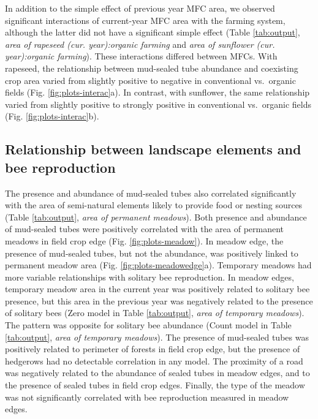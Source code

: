 \documentclass[smallextended]{svjour3}       %
\begin{document}
In addition to the simple effect of previous year MFC area, we observed
significant interactions of current-year MFC area with the farming
system, although the latter did not have a significant simple effect
(Table \ref{tab:output}, \emph{area of rapeseed (cur. year):organic
farming} and \emph{area of sunflower (cur. year):organic farming}).
These interactions differed between MFCs. With rapeseed, the
relationship between mud-sealed tube abundance and coexisting crop area
varied from slightly positive to negative in conventional vs.~organic
fields (Fig. \ref{fig:plots-interac}a). In contrast, with sunflower, the
same relationship varied from slightly positive to strongly positive in
conventional vs.~organic fields (Fig. \ref{fig:plots-interac}b).

\hypertarget{relationship-between-landscape-elements-and-bee-reproduction}{%
\subsection{Relationship between landscape elements and bee
reproduction}\label{relationship-between-landscape-elements-and-bee-reproduction}}

The presence and abundance of mud-sealed tubes also correlated
significantly with the area of semi-natural elements likely to provide
food or nesting sources (Table \ref{tab:output}, \emph{area of permanent
meadows}). Both presence and abundance of mud-sealed tubes were
positively correlated with the area of permanent meadows in field crop
edge (Fig. \ref{fig:plots-meadow}). In meadow edge, the presence of
mud-sealed tubes, but not the abundance, was positively linked to
permanent meadow area (Fig. \ref{fig:plots-meadowedge}a). Temporary
meadows had more variable relationships with solitary bee reproduction.
In meadow edges, temporary meadow area in the current year was
positively related to solitary bee presence, but this area in the
previous year was negatively related to the presence of solitary bees
(Zero model in Table \ref{tab:output}, \emph{area of temporary
meadows}). The pattern was opposite for solitary bee abundance (Count
model in Table \ref{tab:output}, \emph{area of temporary meadows}). The
presence of mud-sealed tubes was positively related to perimeter of
forests in field crop edge, but the presence of hedgerows had no
detectable correlation in any model. The proximity of a road was
negatively related to the abundance of sealed tubes in meadow edges, and
to the presence of sealed tubes in field crop edges. Finally, the type
of the meadow was not significantly correlated with bee reproduction
measured in meadow edges.
\end{document}
